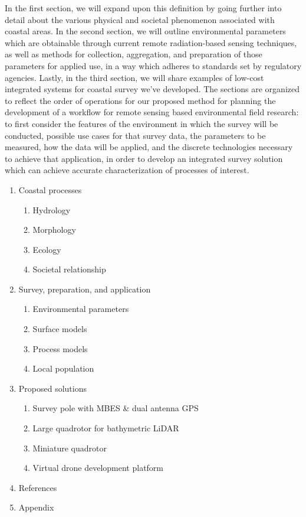 \documentclass{article}
\begin{document}
{In the first section, we will expand upon this definition by going further into detail about the various physical and societal phenomenon associated with coastal areas. In the second section, we will outline environmental parameters which are obtainable through current remote radiation-based sensing techniques, as well as methods for collection, aggregation, and preparation of those parameters for applied use, in a way which adheres to standards set by regulatory agencies. Lastly, in the third section, we will share examples of low-cost integrated systems for coastal survey  we’ve developed. The sections are organized to reflect the order of operations for our proposed method for planning the development of a workflow for remote sensing based environmental field research: to first consider the features of the environment in which the survey will be conducted, possible use cases for that survey data, the parameters to be measured, how the data will be applied, and the discrete technologies necessary to achieve that application, in order to develop an integrated survey solution which can achieve accurate characterization of processes of interest. \par}

\thispagestyle{fancy}

\newpage
{}
\thispagestyle{fancy}
\begin{enumerate}
    \item Coastal processes
    \begin{enumerate}
        \item Hydrology
        \item Morphology
        \item Ecology
        \item Societal relationship
    \end{enumerate}

    \item Survey, preparation, and application
    \begin{enumerate}
        \item Environmental parameters
        \item Surface models
        \item Process models
        \item Local population
    \end{enumerate}

    \item Proposed solutions
    \begin{enumerate}
        \item Survey pole with MBES \& dual antenna GPS
        \item Large quadrotor for bathymetric LiDAR
        \item Miniature quadrotor
        \item Virtual drone development platform
    \end{enumerate}

    \item References
    \item Appendix
\end{enumerate}
\end{document}
